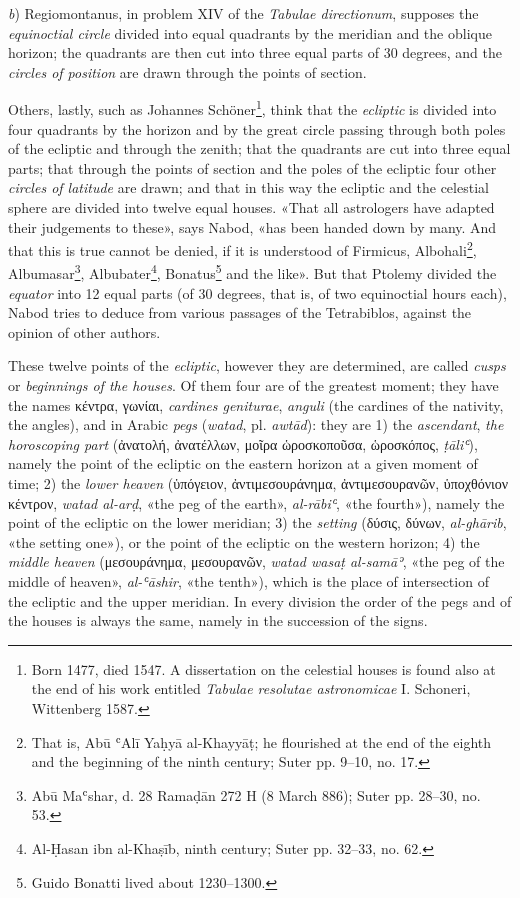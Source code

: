 \documentclass[11pt]{article}
\newcommand{\Pg}[1]{\marginpar{\footnotesize\color{gray}#1}}
\begin{document}
\par \emph{b}) Regiomontanus, in problem XIV of the \emph{Tabulae directionum}, supposes the \emph{equinoctial circle} divided into equal quadrants by the meridian and the oblique horizon; the quadrants are then cut into three equal parts of 30 degrees, and the \emph{circles of position} are drawn through the points of section.\par
\par \Pg{I 248}Others, lastly, such as Johannes Schöner\footnote{Born 1477, died 1547. A dissertation on the celestial houses is found also at the end of his work entitled \emph{Tabulae resolutae astronomicae} I. Schoneri, Wittenberg 1587.}, think that the \emph{ecliptic} is divided into four quadrants by the horizon and by the great circle passing through both poles of the ecliptic and through the zenith; that the quadrants are cut into three equal parts; that through the points of section and the poles of the ecliptic four other \emph{circles of latitude} are drawn; and that in this way the ecliptic and the celestial sphere are divided into twelve equal houses. «That all astrologers have adapted their judgements to these», says Nabod, «has been handed down by many. And that this is true cannot be denied, if it is understood of Firmicus, Albohali\footnote{That is, Abū ʿAlī Yaḥyā al-Khayyāṭ; he flourished at the end of the eighth and the beginning of the ninth century; Suter pp. 9–10, no. 17.}, Albumasar\footnote{Abū Maʿshar, d. 28 Ramaḍān 272 H (8 March 886); Suter pp. 28–30, no. 53.}, Albubater\footnote{Al-Ḥasan ibn al-Khaṣīb, ninth century; Suter pp. 32–33, no. 62.}, Bonatus\footnote{Guido Bonatti lived about 1230–1300.} and the like». But that Ptolemy divided the \emph{equator} into 12 equal parts (of 30 degrees, that is, of two equinoctial hours each), Nabod tries to deduce from various passages of the Tetrabiblos, against the opinion of other authors.\par
\par These twelve points of the \emph{ecliptic}, however they are determined, are called \emph{cusps} or \emph{beginnings of the houses}. Of them four are of the greatest moment; they have the names {\greekfont κέντρα, γωνίαι}, \emph{cardines geniturae}, \emph{anguli} (the cardines of the nativity, the angles), and in Arabic \emph{pegs} (\emph{watad}, pl. \emph{awtād}): they are 1) the \emph{ascendant}, \emph{the horoscoping part} ({\greekfont ἀνατολή, ἀνατέλλων, μοῖρα ὡροσκοποῦσα, ὡροσκόπος}, \emph{ṭāliʿ}), namely the point of the ecliptic on the eastern horizon at a given moment of time; 2) the \emph{lower heaven} ({\greekfont ὑπόγειον, ἀντιμεσουράνημα, ἀντιμεσουρανῶν, ὑποχθόνιον κέντρον}, \emph{watad al-arḍ}, «the peg of the earth», \emph{al-rābiʿ}, «the fourth»), namely the point of the ecliptic on the lower meridian; 3) the \emph{setting} ({\greekfont δύσις, δύνων}, \emph{al-ghārib}, «the setting one»), or the point of the ecliptic on the western horizon; 4) the \emph{middle heaven} ({\greekfont μεσουράνημα, μεσουρανῶν}, \emph{watad wasaṭ al-samāʾ}, «the peg of the middle of heaven», \emph{al-ʿāshir}, «the tenth»), which is the place of intersection of the ecliptic and the upper meridian. In every division the order of the pegs and of the houses is always the same, namely in the succession of the signs.\par
\end{document}
